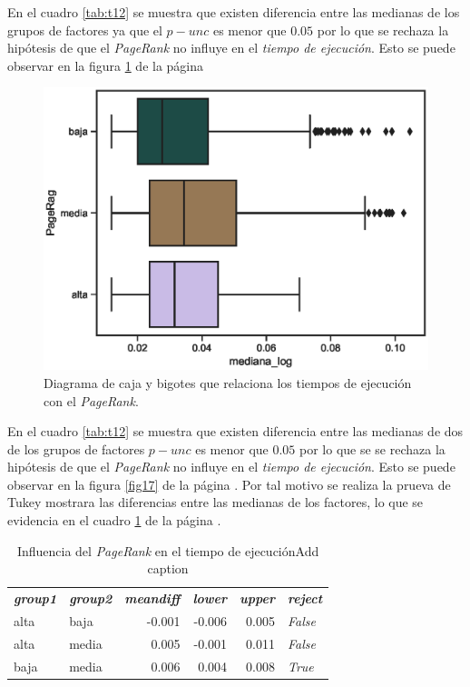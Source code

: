 \documentclass{article}
\begin{document}
En el cuadro \ref{tab:t12} se muestra que existen diferencia entre las medianas de los grupos de factores ya que el \emph{$p-unc$} es menor que $0.05$ por lo que se rechaza la hipótesis de que el \textit{PageRank} no influye en el \textit{tiempo de ejecución}. Esto se puede observar en la figura \ref{fig18} de la página \pageref{fig18}

\begin{center}
\begin{figure}[htbp]
\includegraphics[scale=0.6]{boxplot_PageRag.eps}
\caption{Diagrama de caja y bigotes que relaciona los tiempos de ejecución con el \textit{PageRank}.}
\label{fig18}
\end{figure}
\end{center}


En el cuadro \ref{tab:t12} se muestra que existen  diferencia entre las medianas de dos de los grupos de factores  \textbf{$p-unc$} es menor que $0.05$ por lo que se se rechaza la hipótesis de que el \textit{PageRank} no influye en el \textit{tiempo de ejecución}. Esto se puede observar en la figura \ref{fig17} de la página \pageref{fig17}. Por tal motivo se realiza la prueva de Tukey mostrara las diferencias entre las medianas de los factores, lo que se evidencia en el cuadro \ref{tab:t19} de la página \pageref{tab:t13}.

\begin{table}[htbp]
  \centering
  \caption{Influencia del \textit{PageRank} en el tiempo de ejecuciónAdd caption}
    \begin{tabular}{llrrrl}
    \textit{\textbf{group1}} & \textit{\textbf{group2}} & \multicolumn{1}{l}{\textit{\textbf{meandiff}}} & \multicolumn{1}{l}{\textit{\textbf{lower}}} & \multicolumn{1}{l}{\textit{\textbf{upper}}} & \textit{\textbf{reject}} \\
    alta  & baja  & -0.001 & -0.006 & 0.005 & \textit{False} \\
    alta  & media & 0.005 & -0.001 & 0.011 & \textit{False} \\
    baja  & media & 0.006 & 0.004 & 0.008 & \textit{True} \\
    \end{tabular}%
  \label{tab:t19}%
\end{table}%
\end{document}
